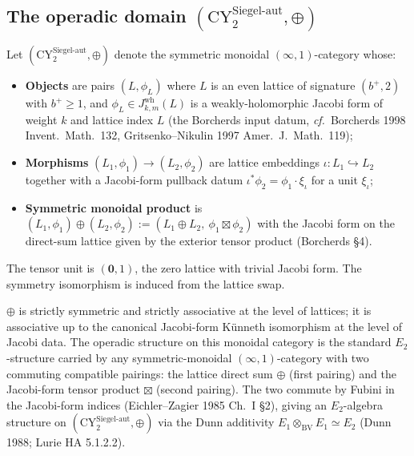 \subsection{The operadic domain \texorpdfstring{$(\mathrm{CY}^{\mathrm{Siegel\text{-}aut}}_2, \oplus)$}{(CY-Siegel-aut-2, (+))}}
\label{subsec:phiutp-operadic-domain}

\begin{definition}
\label{def:phiutp-operadic-domain}
Let $(\mathrm{CY}^{\mathrm{Siegel\text{-}aut}}_2, \oplus)$ denote the
symmetric monoidal $(\infty,1)$-category whose:
\begin{itemize}
 \item \textbf{Objects} are pairs $(L, \phi_L)$ where $L$ is an even
 lattice of signature $(b^+, 2)$ with $b^+ \ge 1$, and
 $\phi_L \in J_{k,m}^{\mathrm{wh}}(L)$ is a weakly-holomorphic
 Jacobi form of weight $k$ and lattice index $L$ \textup{(}the
 Borcherds input datum, \emph{cf.}\ Borcherds 1998 Invent.\ Math.\ 132,
 Gritsenko--Nikulin 1997 Amer.\ J.\ Math.\ 119\textup{);}
 \item \textbf{Morphisms} $(L_1, \phi_1) \to (L_2, \phi_2)$ are
 lattice embeddings $\iota: L_1 \hookrightarrow L_2$ together
 with a Jacobi-form pullback datum
 $\iota^* \phi_2 = \phi_1 \cdot \xi_{\iota}$ for a unit $\xi_\iota$;
 \item \textbf{Symmetric monoidal product} is
 $(L_1, \phi_1) \oplus (L_2, \phi_2) :=
 (L_1 \oplus L_2,\ \phi_1 \boxtimes \phi_2)$ with the Jacobi form
 on the direct-sum lattice given by the exterior tensor product
 (Borcherds \S4).
\end{itemize}
The tensor unit is $(\mathbf{0}, 1)$, the zero lattice with trivial
Jacobi form. The symmetry isomorphism is induced from the lattice swap.
\end{definition}

$\oplus$ is strictly symmetric and strictly associative at the level of
lattices; it is associative up to the canonical Jacobi-form K\"unneth
isomorphism at the level of Jacobi data. The operadic structure on
this monoidal category is the standard $E_2$-structure carried by any
symmetric-monoidal $(\infty,1)$-category with two commuting compatible
pairings: the lattice direct sum $\oplus$ (first pairing) and the
Jacobi-form tensor product $\boxtimes$ (second pairing). The two
commute by Fubini in the Jacobi-form indices
(Eichler--Zagier 1985 Ch.\ I \S2), giving an $E_2$-algebra structure on
$(\mathrm{CY}^{\mathrm{Siegel\text{-}aut}}_2, \oplus)$ via the Dunn
additivity $E_1 \otimes_{\mathrm{BV}} E_1 \simeq E_2$
(Dunn 1988; Lurie HA 5.1.2.2).


